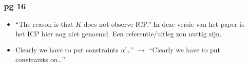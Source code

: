 \documentclass{article}
\theoremstyle{definition}
\begin{document}
\subsubsection*{pg 16}
\begin{itemize}
	\item ``The reason is that $K$ does not observe ICP.'' In deze versie van het paper is het ICP hier nog niet genoemd. Een referentie/uitleg zou nuttig zijn.
	\item Clearly we have to put constraints of\ldots''  $\rightarrow$ ``Clearly we have to put constraints on\ldots''
\end{itemize}
\end{document}

